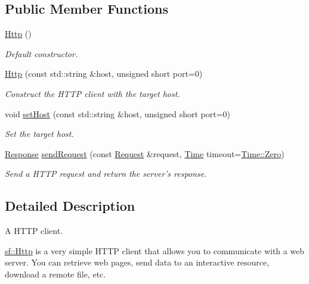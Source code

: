 \subsection*{Public Member Functions}
\begin{DoxyCompactItemize}
\item 
\hypertarget{classsf_1_1_http_abe2360194f99bdde402c9f97a85cf067}{\hyperlink{classsf_1_1_http_abe2360194f99bdde402c9f97a85cf067}{Http} ()}\label{classsf_1_1_http_abe2360194f99bdde402c9f97a85cf067}

\begin{DoxyCompactList}\small\item\em Default constructor. \end{DoxyCompactList}\item 
\hyperlink{classsf_1_1_http_a79efd844a735f083fcce0edbf1092385}{Http} (const std\+::string \&host, unsigned short port=0)
\begin{DoxyCompactList}\small\item\em Construct the H\+T\+T\+P client with the target host. \end{DoxyCompactList}\item 
void \hyperlink{classsf_1_1_http_a55121d543b61c41cf20b885a97b04e65}{set\+Host} (const std\+::string \&host, unsigned short port=0)
\begin{DoxyCompactList}\small\item\em Set the target host. \end{DoxyCompactList}\item 
\hyperlink{classsf_1_1_http_1_1_response}{Response} \hyperlink{classsf_1_1_http_aaf09ebfb5e00dcc82e0d494d5c6a9e2a}{send\+Request} (const \hyperlink{classsf_1_1_http_1_1_request}{Request} \&request, \hyperlink{classsf_1_1_time}{Time} timeout=\hyperlink{classsf_1_1_time_a8db127b632fa8da21550e7282af11fa0}{Time\+::\+Zero})
\begin{DoxyCompactList}\small\item\em Send a H\+T\+T\+P request and return the server's response. \end{DoxyCompactList}\end{DoxyCompactItemize}


\subsection{Detailed Description}
A H\+T\+T\+P client. 

\hyperlink{classsf_1_1_http}{sf\+::\+Http} is a very simple H\+T\+T\+P client that allows you to communicate with a web server. You can retrieve web pages, send data to an interactive resource, download a remote file, etc.

